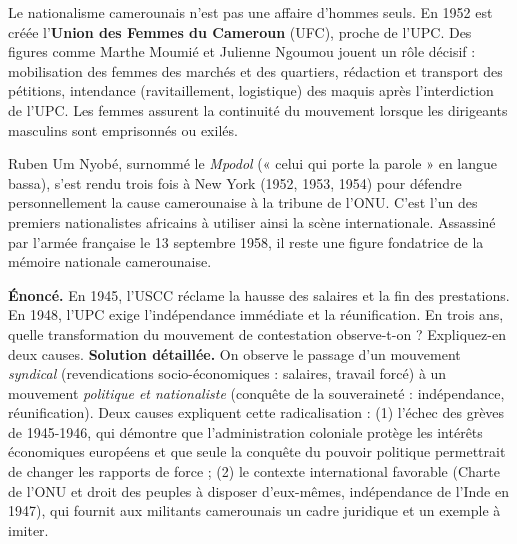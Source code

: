 \documentclass[11pt]{article}
\newcommand{\cle}[1]{{\popxbold\color{popdark}#1}}
\begin{document}
Le nationalisme camerounais n'est pas une affaire d'hommes seuls. En 1952 est créée l'\textbf{Union des Femmes du Cameroun} (UFC), proche de l'UPC. Des figures comme \cle{Marthe Moumié} et \cle{Julienne Ngoumou} jouent un rôle décisif : mobilisation des femmes des marchés et des quartiers, rédaction et transport des pétitions, intendance (ravitaillement, logistique) des maquis après l'interdiction de l'UPC. Les femmes assurent la continuité du mouvement lorsque les dirigeants masculins sont emprisonnés ou exilés.

\begin{savaistu}
Ruben Um Nyobé, surnommé le \emph{Mpodol} (« celui qui porte la parole » en langue bassa), s'est rendu trois fois à New York (1952, 1953, 1954) pour défendre personnellement la cause camerounaise à la tribune de l'ONU. C'est l'un des premiers nationalistes africains à utiliser ainsi la scène internationale. Assassiné par l'armée française le 13 septembre 1958, il reste une figure fondatrice de la mémoire nationale camerounaise.
\end{savaistu}

\begin{exoresolu}
\textbf{Énoncé.} En 1945, l'USCC réclame la hausse des salaires et la fin des prestations. En 1948, l'UPC exige l'indépendance immédiate et la réunification. En trois ans, quelle transformation du mouvement de contestation observe-t-on ? Expliquez-en deux causes.
\tcblower
\textbf{Solution détaillée.} On observe le passage d'un mouvement \emph{syndical} (revendications socio-économiques : salaires, travail forcé) à un mouvement \emph{politique et nationaliste} (conquête de la souveraineté : indépendance, réunification). Deux causes expliquent cette radicalisation : (1) l'échec des grèves de 1945-1946, qui démontre que l'administration coloniale protège les intérêts économiques européens et que seule la conquête du pouvoir politique permettrait de changer les rapports de force ; (2) le contexte international favorable (Charte de l'ONU et droit des peuples à disposer d'eux-mêmes, indépendance de l'Inde en 1947), qui fournit aux militants camerounais un cadre juridique et un exemple à imiter.
\end{exoresolu}
\end{document}

